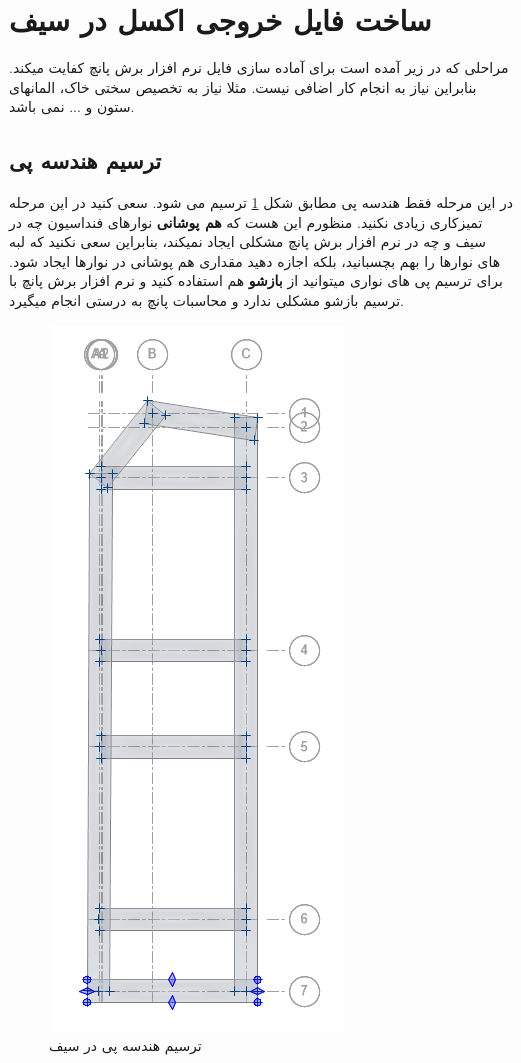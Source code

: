\section{ساخت فایل خروجی اکسل در سیف\label{sec:prepare-safe}}
مراحلی که در زیر آمده است برای آماده سازی فایل نرم افزار برش پانچ کفایت میکند. بنابراین نیاز به انجام کار اضافی نیست. مثلا نیاز به تخصیص سختی خاک، المانهای ستون
و ... نمی باشد.


\subsection{ترسیم هندسه پی}
در این مرحله فقط هندسه پی مطابق شکل 
\ref{geometry}
ترسیم می شود. سعی کنید در این مرحله تمیزکاری زیادی نکنید. منظورم این هست که 
\textbf{هم پوشانی}
 نوارهای فنداسیون چه در سیف و چه در نرم افزار برش پانچ مشکلی ایجاد نمیکند،
بنابراین سعی نکنید که لبه های نوارها را بهم بچسبانید، بلکه اجازه دهید مقداری هم پوشانی در نوارها ایجاد شود.
برای ترسیم پی های نواری میتوانید از 
\textbf{بازشو}
 هم استفاده کنید و نرم افزار برش پانچ با ترسیم بازشو مشکلی ندارد و محاسبات پانچ به درستی انجام میگیرد.

\begin{figure}[H]
    \centering
    \includegraphics[scale=.6]{figures/geometry2}
    \caption{ترسیم هندسه پی در سیف}
    \label{geometry}
\end{figure}


